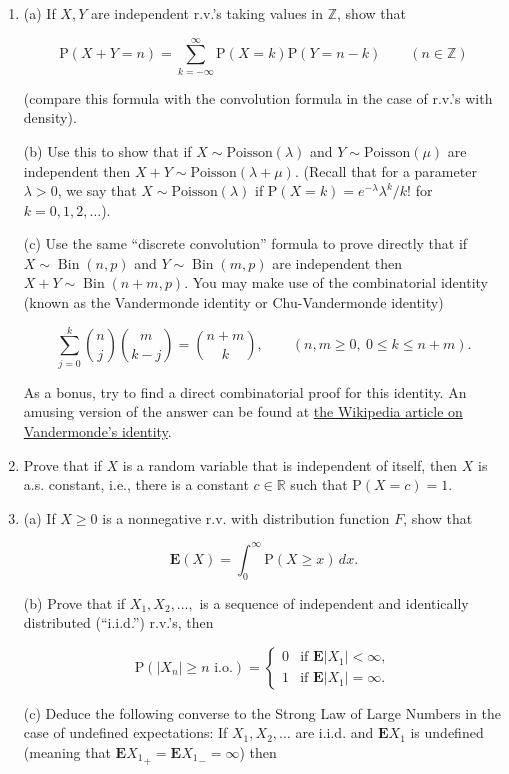 \documentclass[11pt]{report}
\newcommand{\R}{\mathbb{R}}
\newcommand{\Z}{\mathbb{Z}}
\theoremstyle{plain}
\theoremstyle{definition}
\begin{document}
\begin{enumerate}[label=\arabic*.]
\item (a) If $X,Y$ are independent r.v.'s taking values in
$\Z$, show that

\[
\mathrm{P}(X+Y = n) = \sum_{k=-\infty}^\infty \mathrm{P}(X=k) \mathrm{P}(Y=n-k) \qquad(n\in\Z)
\]

(compare this formula with the convolution formula
in the case of r.v.'s with density).

(b) Use this to show that if
$X\sim \textrm{Poisson}(\lambda)$ and
$Y\sim \textrm{Poisson}(\mu)$ are independent then
$X+Y \sim \textrm{Poisson}(\lambda+\mu)$. (Recall
that for a parameter $\lambda>0$, we say that
$X\sim \textrm{Poisson}(\lambda)$ if
$\mathrm{P}(X=k)=e^{-\lambda} \lambda^k/k!$ for
$k=0,1,2,\ldots$).

(c) Use the same ``discrete convolution'' formula to
prove directly that if
$X \sim \operatorname{Bin}(n,p)$ and
$Y\sim \operatorname{Bin}(m,p)$ are independent then
$X+Y \sim \operatorname{Bin}(n+m,p)$. You may make
use of the combinatorial identity (known as the
Vandermonde identity or Chu-Vandermonde identity)

\[
\sum_{j=0}^k \binom{n}{j} \binom{m}{k-j} = \binom{n+m}{k}, \qquad (n,m\ge 0,\ 0\le k\le n+m).
\]

As a bonus, try to find a direct combinatorial proof
for this identity. An amusing version of the answer
can be found at \href{http://en.wikipedia.org/wiki/Vandermonde's_identity}{the Wikipedia article on
Vandermonde's
identity}.

\item Prove that if $X$ is a random variable that is
independent of itself, then $X$ is a.s. constant,
i.e., there is a constant $c\in\R$ such that
$\mathrm{P}(X=c)=1$.

\item (a) If $X\ge 0$ is a nonnegative r.v. with
distribution function $F$, show that

\[
\mathbf{E}(X)=\int_0^\infty \mathrm{P}(X\ge x)\,dx.
\]

(b) Prove that if $X_1, X_2, \ldots,$ is a sequence
of independent and identically distributed
(``i.i.d.'') r.v.'s, then

\[
\mathrm{P}(|X_n|\ge n\textrm{ i.o.})=\begin{cases} 0 & \textrm{if }\mathbf{E}|X_1|<\infty, \\
1 & \textrm{if }\mathbf{E}|X_1|=\infty. \end{cases}
\]

(c) Deduce the following converse to the Strong Law
of Large Numbers in the case of undefined
expectations: If $X_1,X_2,\ldots$ are i.i.d. and
$\mathbf{E} X_1$ is undefined (meaning that
$\mathbf{E} {X_1}_+ = \mathbf{E} {X_1}_- = \infty$)
then


\end{enumerate}
\end{document}
